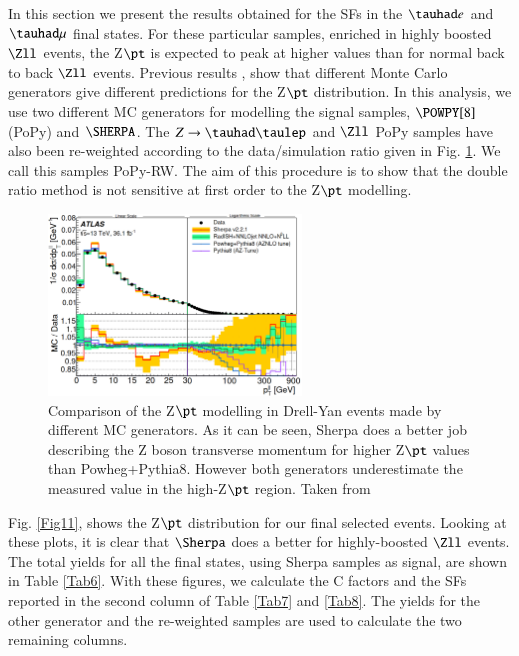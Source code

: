 In this section we present the results obtained for the SFs in the $\tauhad e$ and $\tauhad \mu$ final states. For these particular samples, enriched in highly boosted $\Zll$ events, the Z$\pt$ is expected to peak at higher values than for normal back to back $\Zll$ events. Previous results \cite{Aad:2019wmn}, show that different Monte Carlo generators give different predictions for the Z$\pt$ distribution. In this analysis, we use two different MC generators for modelling the signal samples, $\POWPY[8]$(PoPy) and $\SHERPA$. The $Z\to\tauhad\taulep$ and $\Zll$ PoPy samples have also been re-weighted according to the data/simulation ratio given in Fig. \ref{Fig10}. We call this samples PoPy-RW. The aim of this procedure is to show that the double ratio method is not sensitive at first order to the Z$\pt$ modelling.

\begin{figure}[htbp]
	\centering
	\includegraphics[width=0.6\textwidth]{figures/Fig10}
	\caption{Comparison of the Z$\pt$ modelling in Drell-Yan events made by different MC generators. As it can be seen, Sherpa does a better job describing the Z boson transverse momentum for higher Z$\pt$ values than Powheg+Pythia8. However both generators underestimate the measured value in the high-Z$\pt$ region. Taken from \cite{Aad:2019wmn}}
	\label{Fig10}
\end{figure}

Fig. \ref{Fig11}, shows the Z$\pt$ distribution for our final selected events. Looking at these plots, it is clear that $\Sherpa$ does a better for highly-boosted $\Zll$ events. The total yields for all the final states, using Sherpa samples as signal, are shown in Table \ref{Tab6}. With these figures, we calculate the C factors and the SFs reported in the second column of Table \ref{Tab7} and \ref{Tab8}. The yields for the other generator and the re-weighted samples are used to calculate the two remaining columns.

